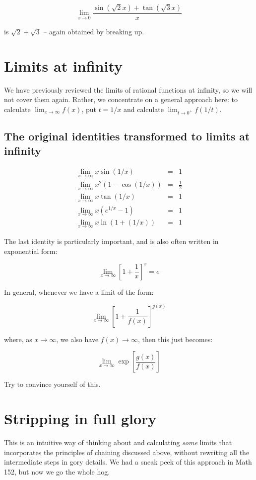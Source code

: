 \documentclass{amsart}
\begin{document}
$$\lim_{x \to 0} \frac{\sin(\sqrt{2}x) + \tan(\sqrt{3}x)}{x}$$

is $\sqrt{2} + \sqrt{3}$ -- again obtained by breaking up.

\section{Limits at infinity}

We have previously reviewed the limits of rational functions at
infinity, so we will not cover them again. Rather, we concentrate on a
general approach here: to calculate $\lim_{x \to \infty} f(x)$, put $t
= 1/x$ and calculate $\lim_{t \to 0^+} f(1/t)$.

\subsection{The original identities transformed to limits at infinity}

\begin{eqnarray*}
  \lim_{x \to \infty} x\sin(1/x) & = & 1\\
  \lim_{x \to \infty} x^2(1 - \cos(1/x)) & = & \frac{1}{2}\\
  \lim_{x \to \infty} x\tan(1/x) & = & 1 \\
  \lim_{x \to \infty} x(e^{1/x} - 1) & = & 1 \\
  \lim_{x \to \infty} x\ln(1 + (1/x)) & = & 1
\end{eqnarray*}

The last identity is particularly important, and is also often written
in exponential form:

$$\lim_{x \to \infty} \left[1 + \frac{1}{x}\right]^x = e$$

In general, whenever we have a limit of the form:

$$\lim_{x \to \infty} \left[1 + \frac{1}{f(x)}\right]^{g(x)}$$

where, as $x \to \infty$, we also have $f(x) \to \infty$, then this
just becomes:

$$\lim_{x \to \infty} \exp\left[\frac{g(x)}{f(x)}\right]$$

Try to convince yourself of this.

\section{Stripping in full glory}

This is an intuitive way of thinking about and calculating {\em some}
limits that incorporates the principles of chaining discussed above,
without rewriting all the intermediate steps in gory details. We had a
sneak peek of this approach in Math 152, but now we go the whole hog.
\end{document}

